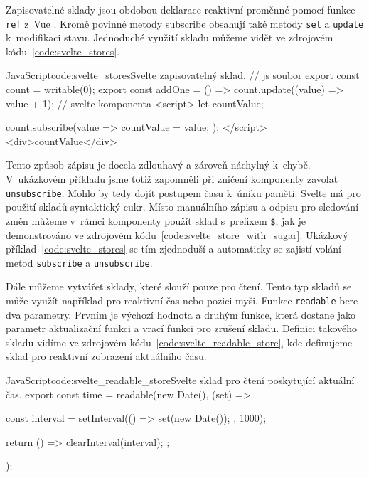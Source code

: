 \documentclass[
  master,
  program=ainf,
  tables=false,
  sourcecodes,
  glossaries,
  index
]{kidiplom}
\begin{document}
Zapisovatelné sklady jsou obdobou deklarace reaktivní proměnné pomocí funkce {\tt ref} z~Vue \cite{vue}. Kromě povinné metody
subscribe obsahují také metody {\tt set} a {\tt update} k~modifikaci stavu. Jednoduché využití skladu můžeme vidět
ve zdrojovém kódu~\ref{code:svelte_stores}.

  \begin{kicode}{JavaScript}{code:svelte_stores}{Svelte zapisovatelný sklad.}
    // js soubor
    export const count = writable(0);
    export const addOne = () => count.update((value) => value + 1);
    // svelte komponenta
    <script>
      let countValue;

      count.subscribe(value => {
        countValue = value;
      });
    </script>
    <div>{countValue}</div>
  \end{kicode}

Tento způsob zápisu je docela zdlouhavý a zároveň náchylný k~chybě. V~ukázkovém příkladu jsme totiž zapomněli
při zničení komponenty zavolat \\{\tt unsubscribe}. Mohlo by tedy dojít postupem času k~úniku paměti. Svelte \cite{svelte} má pro
použití skladů syntaktický cukr. Místo manuálního zápisu a odpisu pro sledování změn můžeme v~rámci komponenty
použít sklad s~prefixem {\tt \$}, jak je demonstrováno ve zdrojovém kódu~\ref{code:svelte_store_with_sugar}.
Ukázkový příklad~\ref{code:svelte_stores} se tím zjednoduší a automaticky se zajistí volání metod {\tt subscribe} a {\tt unsubscribe}.


Dále můžeme vytvářet sklady, které slouží pouze pro čtení. Tento typ skladů se může využít například pro
reaktivní čas nebo pozici myši. Funkce {\tt readable} bere dva parametry. Prvním je výchozí hodnota a druhým funkce,
která dostane jako parametr aktualizační funkci a vrací funkci pro zrušení skladu. Definici takového skladu
vidíme ve zdrojovém kódu~\ref{code:svelte_readable_store}, kde definujeme sklad pro reaktivní zobrazení aktuálního času.

\begin{absolutelynopagebreak}
  \begin{kicode}{JavaScript}{code:svelte_readable_store}{Svelte sklad pro čtení poskytující aktuální čas.}
    export const time = readable(new Date(), (set) => {
      const interval = setInterval(() => {
        set(new Date());
      }, 1000);

      return () => {
        clearInterval(interval);
      };
    });
  \end{kicode}
\end{absolutelynopagebreak}
\end{document}
